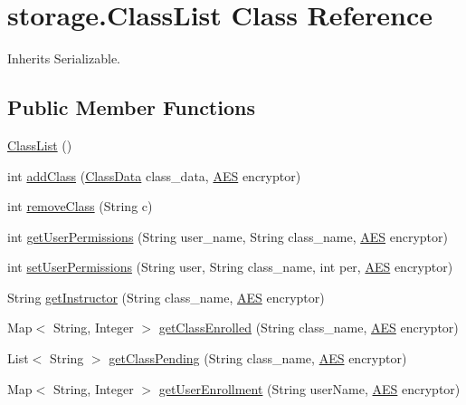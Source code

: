 \hypertarget{classstorage_1_1_class_list}{
\section{storage.\-Class\-List \-Class \-Reference}
\label{classstorage_1_1_class_list}
}


\-Inherits \-Serializable.

\subsection*{\-Public \-Member \-Functions}
\begin{DoxyCompactItemize}
\item 
\hyperlink{classstorage_1_1_class_list_adc33a28f59356a2c967a12acdb96ea38}{\-Class\-List} ()
\item 
int \hyperlink{classstorage_1_1_class_list_ad72fdb32fe18f1390b26558c53e0625e}{add\-Class} (\hyperlink{classstorage_1_1_class_data}{\-Class\-Data} class\-\_\-data, \hyperlink{classsecurity_1_1_a_e_s}{\-A\-E\-S} encryptor)
\item 
int \hyperlink{classstorage_1_1_class_list_a035ec4f59953ef87785ff92e072165b8}{remove\-Class} (\-String c)
\item 
int \hyperlink{classstorage_1_1_class_list_a2203b5b8b65943e45cc61614a8309487}{get\-User\-Permissions} (\-String user\-\_\-name, \-String class\-\_\-name, \hyperlink{classsecurity_1_1_a_e_s}{\-A\-E\-S} encryptor)
\item 
int \hyperlink{classstorage_1_1_class_list_a612b5fdcba10ec90e22aa586ee34ab9f}{set\-User\-Permissions} (\-String user, \-String class\-\_\-name, int per, \hyperlink{classsecurity_1_1_a_e_s}{\-A\-E\-S} encryptor)
\item 
\-String \hyperlink{classstorage_1_1_class_list_a88e44d6e4481d58ca3500f91742ca1c5}{get\-Instructor} (\-String class\-\_\-name, \hyperlink{classsecurity_1_1_a_e_s}{\-A\-E\-S} encryptor)
\item 
\-Map$<$ \-String, \-Integer $>$ \hyperlink{classstorage_1_1_class_list_a7c4fb447a1b1078f8c53f5b8bf5d7791}{get\-Class\-Enrolled} (\-String class\-\_\-name, \hyperlink{classsecurity_1_1_a_e_s}{\-A\-E\-S} encryptor)
\item 
\-List$<$ \-String $>$ \hyperlink{classstorage_1_1_class_list_aa409d9ff70e5a51f1a0934c92769d810}{get\-Class\-Pending} (\-String class\-\_\-name, \hyperlink{classsecurity_1_1_a_e_s}{\-A\-E\-S} encryptor)
\item 
\-Map$<$ \-String, \-Integer $>$ \hyperlink{classstorage_1_1_class_list_a5a5d2d558989217378d8605db066781b}{get\-User\-Enrollment} (\-String user\-Name, \hyperlink{classsecurity_1_1_a_e_s}{\-A\-E\-S} encryptor)

\end{DoxyCompactItemize}
